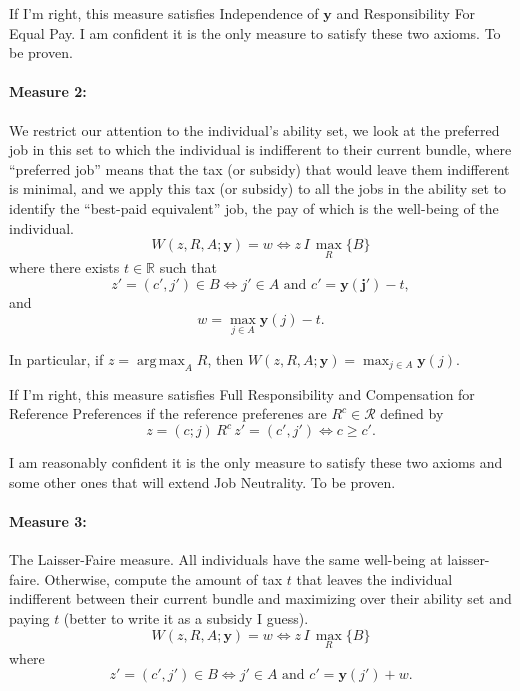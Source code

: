 \documentclass[12pt,thmsb]{article}
\DeclareMathOperator*{\argmax}{arg\,max}
\begin{document}
If I'm right, this measure satisfies Independence of $\mathbf{y}$ and Responsibility For Equal Pay. I am confident it is the only measure to satisfy these two axioms. To be proven.

\paragraph{Measure 2:} We restrict our attention to the individual's ability set, we look at the preferred job in this set to which the individual is indifferent to their current bundle, where ``preferred job'' means that the tax (or subsidy) that would leave them indifferent is minimal, and we apply this tax (or subsidy) to all the jobs in the ability set to identify the ``best-paid equivalent'' job, the pay of which is the well-being of the individual.
\begin{equation*}
W(z, R, A;\mathbf{y})=w\Leftrightarrow z\,I\,\max_R\{B\}
\end{equation*}
where there exists $t\in\mathbb{R}$ such that
\begin{equation*}
z'=(c',j')\in B\Leftrightarrow j'\in A \textrm{ and } c'=\mathbf{y(j')}-t,
\end{equation*}
and
\begin{equation*}
w=\max_{j\in A}\mathbf{y}(j)-t.
\end{equation*}

In particular, if $z=\argmax_A R$, then $W(z, R, A;\mathbf{y})=\max_{j\in A}\mathbf{y}(j)$.

If I'm right, this measure satisfies Full Responsibility and Compensation for Reference Preferences if the reference preferenes are $R^{c}\in\mathcal{R}$ defined by
\begin{equation*}
z=(c;j)\,R^{c}\,z'=(c',j')\Leftrightarrow c\geq c'.
\end{equation*}

I am reasonably confident it is the only measure to satisfy these two axioms and some other ones that will extend Job Neutrality. To be proven.

\paragraph{Measure 3:} The Laisser-Faire measure. All individuals have the same well-being at laisser-faire. Otherwise, compute the amount of tax $t$ that leaves the individual indifferent between their current bundle and maximizing over their ability set and paying $t$ (better to write it as a subsidy I guess).
\begin{equation*}
W(z, R, A;\mathbf{y})=w\Leftrightarrow z\,I\,\max_R\{B\}
\end{equation*}
where
\begin{equation*}
z'=(c',j')\in B\Leftrightarrow j'\in A \textrm{ and } c'=\mathbf{y}(j')+w.
\end{equation*}
\end{document}
